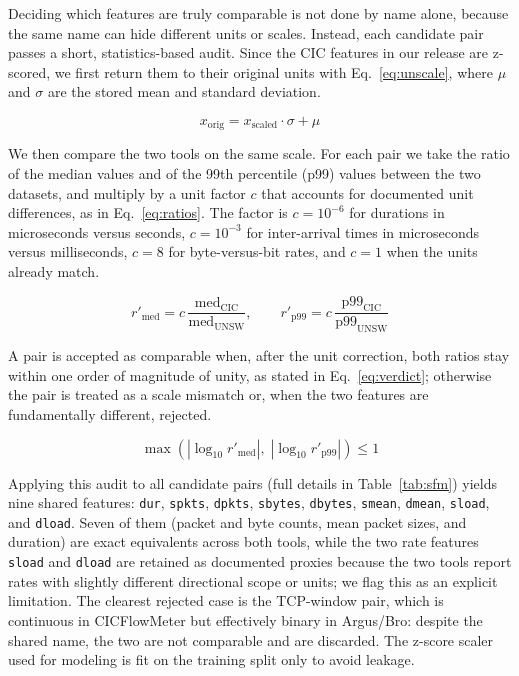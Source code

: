 \documentclass[11pt,a4paper]{article}
\begin{document}
Deciding which features are truly comparable is not done by name alone, because the same
name can hide different units or scales. Instead, each candidate pair passes a short,
statistics-based audit. Since the CIC features in our release are z-scored, we first
return them to their original units with Eq.~\eqref{eq:unscale}, where $\mu$ and $\sigma$
are the stored mean and standard deviation.

\begin{equation}
  x_{\mathrm{orig}} = x_{\mathrm{scaled}} \cdot \sigma + \mu
  \label{eq:unscale}
\end{equation}

We then compare the two tools on the same scale. For each pair we take the ratio of the
median values and of the 99th percentile (p99) values between the two datasets, and
multiply by a unit factor $c$ that accounts for documented unit differences, as in
Eq.~\eqref{eq:ratios}. The factor is $c=10^{-6}$ for durations in microseconds versus
seconds, $c=10^{-3}$ for inter-arrival times in microseconds versus milliseconds, $c=8$
for byte-versus-bit rates, and $c=1$ when the units already match.

\begin{equation}
  r'_{\mathrm{med}} = c\,\frac{\mathrm{med}_{\mathrm{CIC}}}{\mathrm{med}_{\mathrm{UNSW}}},
  \qquad
  r'_{\mathrm{p99}} = c\,\frac{\mathrm{p99}_{\mathrm{CIC}}}{\mathrm{p99}_{\mathrm{UNSW}}}
  \label{eq:ratios}
\end{equation}

A pair is accepted as comparable when, after the unit correction, both ratios stay
within one order of magnitude of unity, as stated in Eq.~\eqref{eq:verdict}; otherwise
the pair is treated as a scale mismatch or, when the two features are fundamentally
different, rejected.

\begin{equation}
  \max\!\left(|\log_{10} r'_{\mathrm{med}}|,\; |\log_{10} r'_{\mathrm{p99}}|\right) \le 1
  \label{eq:verdict}
\end{equation}

Applying this audit to all candidate pairs (full details in Table~\ref{tab:sfm}) yields
nine shared features: \texttt{dur}, \texttt{spkts}, \texttt{dpkts}, \texttt{sbytes},
\texttt{dbytes}, \texttt{smean}, \texttt{dmean}, \texttt{sload}, and \texttt{dload}.
Seven of them (packet and byte counts, mean packet sizes, and duration) are exact
equivalents across both tools, while the two rate features \texttt{sload} and
\texttt{dload} are retained as documented proxies because the two tools report rates with
slightly different directional scope or units; we flag this as an explicit limitation.
The clearest rejected case is the TCP-window pair, which is continuous in CICFlowMeter
but effectively binary in Argus/Bro: despite the shared name, the two are not comparable
and are discarded. The z-score scaler used for modeling is fit on the training split only
to avoid leakage.
\end{document}
